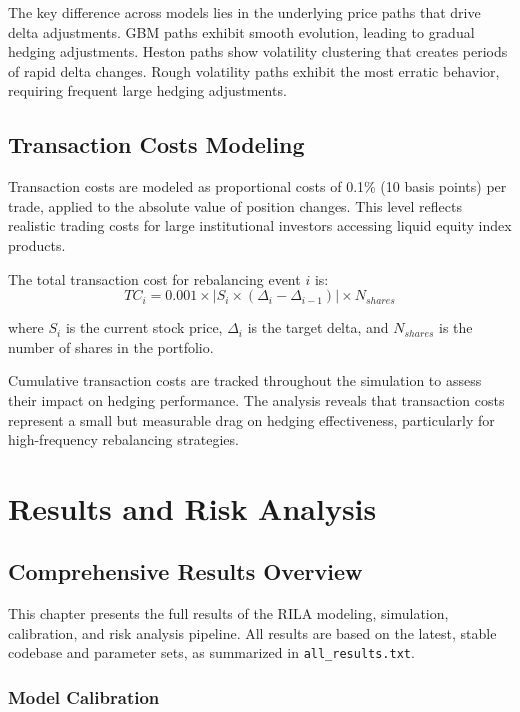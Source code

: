 \documentclass[12pt,a4paper]{report}
\begin{document}
The key difference across models lies in the underlying price paths that drive delta adjustments. GBM paths exhibit smooth evolution, leading to gradual hedging adjustments. Heston paths show volatility clustering that creates periods of rapid delta changes. Rough volatility paths exhibit the most erratic behavior, requiring frequent large hedging adjustments.

\section{Transaction Costs Modeling}

Transaction costs are modeled as proportional costs of 0.1\% (10 basis points) per trade, applied to the absolute value of position changes. This level reflects realistic trading costs for large institutional investors accessing liquid equity index products.

The total transaction cost for rebalancing event $i$ is:
\begin{equation}
TC_i = 0.001 \times |S_i \times (\Delta_i - \Delta_{i-1})| \times N_{shares}
\end{equation}

where $S_i$ is the current stock price, $\Delta_i$ is the target delta, and $N_{shares}$ is the number of shares in the portfolio.

Cumulative transaction costs are tracked throughout the simulation to assess their impact on hedging performance. The analysis reveals that transaction costs represent a small but measurable drag on hedging effectiveness, particularly for high-frequency rebalancing strategies.

\chapter{Results and Risk Analysis}

\section{Comprehensive Results Overview}

This chapter presents the full results of the RILA modeling, simulation, calibration, and risk analysis pipeline. All results are based on the latest, stable codebase and parameter sets, as summarized in \texttt{all\_results.txt}.

\subsection{Model Calibration}
\end{document}
